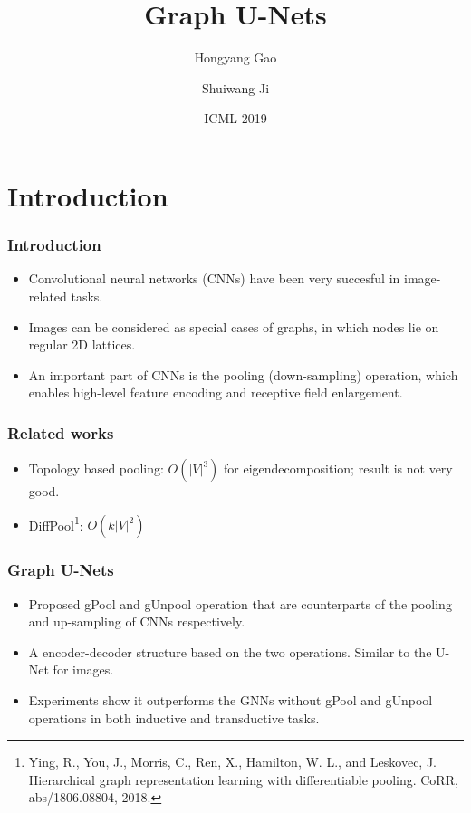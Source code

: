 \documentclass[12pt,aspectratio=169]{beamer}
\title{Graph U-Nets}
\author{Hongyang Gao\inst{1} \and Shuiwang Ji\inst{1}}
\institute{\inst{1} Texas A\&M University, TX, USA}
\date{ICML 2019}
\begin{document}
    \beamertemplatenavigationsymbolsempty

    \makeatletter
    \def\beamer@andinst{\\[.1em]}
    \makeatother

    \begin{frame}
        \titlepage
    \end{frame}

    \section{Introduction}

    \begin{frame}
        \frametitle{Introduction}

        \begin{itemize}
            \setlength{\itemsep}{.8em}
            \item Convolutional neural networks (CNNs) have been very succesful in image-related tasks.
            \item Images can be considered as special cases of graphs, in which nodes lie on regular 2D lattices.
            \item An important part of CNNs is the pooling (down-sampling) operation, which enables high-level feature encoding and receptive field enlargement.
        \end{itemize}
    \end{frame}

    \begin{frame}
        \frametitle{Related works}

        \begin{itemize}
            \setlength{\itemsep}{.8em}
            \item Topology based pooling: $O(|V|^3)$ for eigendecomposition; result is not very good.
            \item DiffPool\footnote{Ying, R., You, J., Morris, C., Ren, X., Hamilton, W. L., and Leskovec, J. Hierarchical graph representation learning with differentiable pooling. CoRR, abs/1806.08804, 2018.}: $O(k|V|^2)$
        \end{itemize}

    \end{frame}

    \begin{frame}
        \frametitle{Graph U-Nets}

        \begin{itemize}
            \setlength{\itemsep}{.8em}
            \item Proposed gPool and gUnpool operation that are counterparts of the pooling and up-sampling of CNNs respectively.
            \item A encoder-decoder structure based on the two operations. Similar to the U-Net for images.
            \item Experiments show it outperforms the GNNs without gPool and gUnpool operations in both inductive and transductive tasks.
        \end{itemize}

    \end{frame}
\end{document}
